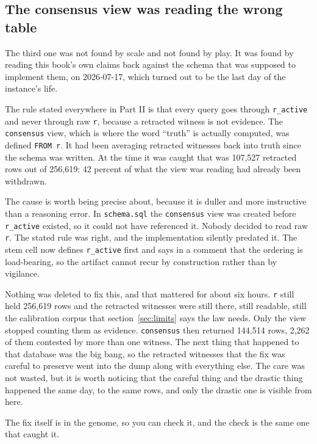 \subsection{The consensus view was reading the wrong table}
\label{sec:consensus-view-fix}

The third one was not found by scale and not found by play. It was found by reading this book's own claims back against the schema that was supposed to implement them, on 2026-07-17, which turned out to be the last day of the instance's life.

The rule stated everywhere in Part II is that every query goes through \texttt{r\_active} and never through raw \texttt{r}, because a retracted witness is not evidence. The \texttt{consensus} view, which is where the word ``truth'' is actually computed, was defined \texttt{FROM r}. It had been averaging retracted witnesses back into truth since the schema was written. At the time it was caught that was 107{,}527 retracted rows out of 256{,}619: 42 percent of what the view was reading had already been withdrawn.

The cause is worth being precise about, because it is duller and more instructive than a reasoning error. In \texttt{schema.sql} the \texttt{consensus} view was created before \texttt{r\_active} existed, so it could not have referenced it. Nobody decided to read raw \texttt{r}. The stated rule was right, and the implementation silently predated it. The stem cell now defines \texttt{r\_active} first and says in a comment that the ordering is load-bearing, so the artifact cannot recur by construction rather than by vigilance.

Nothing was deleted to fix this, and that mattered for about six hours. \texttt{r} still held 256{,}619 rows and the retracted witnesses were still there, still readable, still the calibration corpus that section~\ref{sec:limits} says the law needs. Only the view stopped counting them as evidence. \texttt{consensus} then returned 144{,}514 rows, 2{,}262 of them contested by more than one witness. The next thing that happened to that database was the big bang, so the retracted witnesses that the fix was careful to preserve went into the dump along with everything else. The care was not wasted, but it is worth noticing that the careful thing and the drastic thing happened the same day, to the same rows, and only the drastic one is visible from here.

The fix itself is in the genome, so you can check it, and the check is the same one that caught it.

